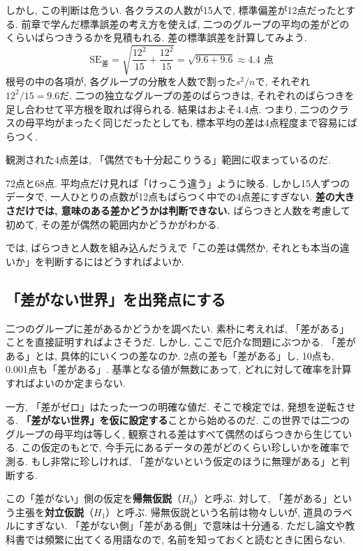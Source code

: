     しかし, この判断は危うい.
    各クラスの人数が15人で, 標準偏差が12点だったとする.
    前章で学んだ標準誤差の考え方を使えば, 二つのグループの平均の差がどのくらいばらつきうるかを見積もれる.
    差の標準誤差を計算してみよう.
    \[
      \mathrm{SE}_{\text{差}} = \sqrt{\frac{12^2}{15} + \frac{12^2}{15}} = \sqrt{9.6 + 9.6} \approx 4.4 \text{ 点}
    \]
    根号の中の各項が, 各グループの分散を人数で割った$s^2 / n$で, それぞれ$12^2 / 15 = 9.6$だ.
    二つの独立なグループの差のばらつきは, それぞれのばらつきを足し合わせて平方根を取れば得られる.
    結果はおよそ4.4点.
    つまり, 二つのクラスの母平均がまったく同じだったとしても, 標本平均の差は4点程度まで容易にばらつく.

    観測された4点差は, 「偶然でも十分起こりうる」範囲に収まっているのだ.

    72点と68点. 平均点だけ見れば「けっこう違う」ように映る.
    しかし15人ずつのデータで, 一人ひとりの点数が12点もばらつく中での4点差にすぎない.
    \textbf{差の大きさだけでは, 意味のある差かどうかは判断できない.}
    ばらつきと人数を考慮して初めて, その差が偶然の範囲内かどうかがわかる.

    では, ばらつきと人数を組み込んだうえで「この差は偶然か, それとも本当の違いか」を判断するにはどうすればよいか.


  \subsection{「差がない世界」を出発点にする}

    二つのグループに差があるかどうかを調べたい.
    素朴に考えれば, 「差がある」ことを直接証明すればよさそうだ.
    しかし, ここで厄介な問題にぶつかる.
    「差がある」とは, 具体的にいくつの差なのか.
    2点の差も「差がある」し, 10点も, 0.001点も「差がある」.
    基準となる値が無数にあって, どれに対して確率を計算すればよいのか定まらない.

    一方, 「差がゼロ」はたった一つの明確な値だ.
    そこで検定では, 発想を逆転させる.
    \textbf{「差がない世界」を仮に設定する}ことから始めるのだ.
    この世界では二つのグループの母平均は等しく, 観察される差はすべて偶然のばらつきから生じている.
    この仮定のもとで, 今手元にあるデータの差がどのくらい珍しいかを確率で測る.
    もし非常に珍しければ, 「差がないという仮定のほうに無理がある」と判断する.

    この「差がない」側の仮定を\textbf{帰無仮説}（$H_0$）と呼ぶ.
    対して, 「差がある」という主張を\textbf{対立仮説}（$H_1$）と呼ぶ.
    帰無仮説という名前は物々しいが, 道具のラベルにすぎない.
    「差がない側」「差がある側」で意味は十分通る.
    ただし論文や教科書では頻繁に出てくる用語なので, 名前を知っておくと読むときに困らない.

